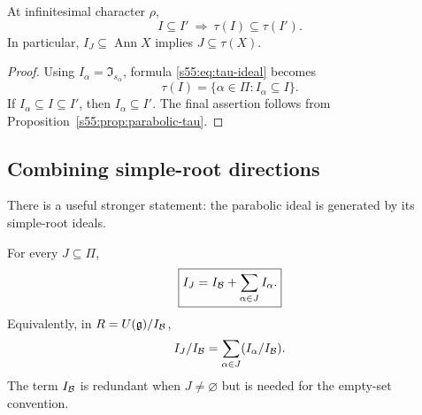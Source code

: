 \begin{cor}
\label{s55:cor:monotone}
At infinitesimal character $\rho$,
\[
  \boxed{I\subseteq I'\ \Longrightarrow\ \tau(I)\subseteq\tau(I').}
\]
In particular, $I_J\subseteq\operatorname{Ann}X$ implies
$J\subseteq\tau(X)$.
\end{cor}

\begin{proof}
Using $I_\alpha=\mathfrak I_{s_\alpha}$, formula
\eqref{s55:eq:tau-ideal} becomes
\[
  \tau(I)=\{\alpha\in\Pi:I_\alpha\subseteq I\}.
\]
If $I_\alpha\subseteq I\subseteq I'$, then $I_\alpha\subseteq I'$.
The final assertion follows from Proposition~\ref{s55:prop:parabolic-tau}.
\end{proof}

\subsection{Combining simple-root directions}

There is a useful stronger statement: the parabolic ideal is generated
by its simple-root ideals.

\begin{prop}
\label{s55:prop:sum}
For every $J\subseteq\Pi$,
\begin{equation}
\label{s55:eq:ideal-sum}
 \boxed{I_J=I_{\mathcal{B}}+\sum_{\alpha\in J}I_\alpha.}
\end{equation}
Equivalently, in $R=U(\mathfrak{g})/I_{\mathcal{B}}$,
\[
 I_J/I_{\mathcal{B}}=\sum_{\alpha\in J}(I_\alpha/I_{\mathcal{B}}).
\]
The term $I_{\mathcal{B}}$ is redundant when $J\ne\varnothing$ but is needed
for the empty-set convention.
\end{prop}

